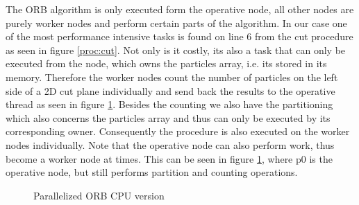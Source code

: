 \documentclass[]{article}
\begin{document}
The ORB algorithm is only executed form the operative node, all other nodes are purely worker nodes and perform certain parts of the algorithm. In our case one of the most performance intensive tasks is found on line 6 from the cut procedure as seen in figure \ref{proc:cut}. Not only is it costly, its also a task that can only be executed from the node, which owns the particles array, i.e. its stored in its memory. Therefore the worker nodes count the number of particles on the left side of a 2D cut plane individually and send back the results to the operative thread as seen in figure \ref{fig:orbp}. Besides the counting we also have the partitioning which also concerns the particles array and thus can only be executed by its corresponding owner. Consequently the procedure is also executed on the worker nodes individually. Note that the operative node can also perform work, thus become a worker node at times. This can be seen in figure \ref{fig:orbp}, where p0 is the operative node, but still performs partition and counting operations.

\begin{figure}[H]
	\begin{center}
	\end{center}
	\caption{Parallelized ORB CPU version}
	\label{fig:orbp}
\end{figure}
\end{document}
